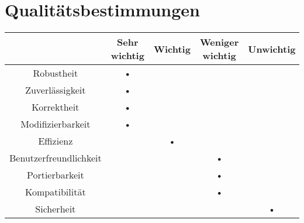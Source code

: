 \section{Qualitätsbestimmungen}

\begin{tabular}{|c|c|c|c|c|}
\hline & Sehr wichtig & Wichtig & Weniger wichtig & Unwichtig \\
\hline Robustheit & • &  &  & \\ 
\hline Zuverlässigkeit & • &  &  & \\ 
\hline Korrektheit\footnotemark & • &  &  & \\ 
\hline Modifizierbarkeit & • &  &  & \\ 
\hline Effizienz &  & • &  & \\ 
\hline Benutzerfreundlichkeit &  &  & • & \\ 
\hline Portierbarkeit &  &  & • & \\ 
\hline Kompatibilität &  &  & • & \\ 
\hline Sicherheit &  &  &  & • \\ 
\hline 
\end{tabular}

